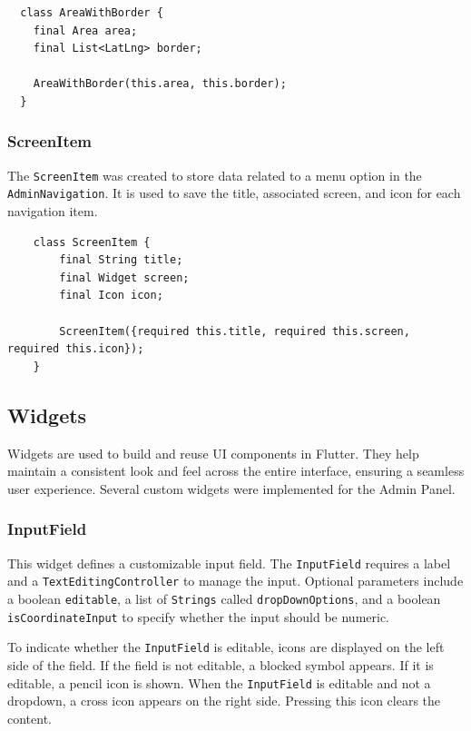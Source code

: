 \lstset{style=mycsharp, caption=AreaWithBorder class}
\begin{lstlisting}
  class AreaWithBorder {
    final Area area;
    final List<LatLng> border;
  
    AreaWithBorder(this.area, this.border);
  }
\end{lstlisting}

\subsubsection{ScreenItem}
\label{fig:ScreenItem}
The \texttt{ScreenItem} was created to store data related to a menu option in the \texttt{AdminNavigation}. It is used to save the title, associated screen, and icon for each navigation item.

\lstset{style=mycsharp, caption=ScreenItem class}
\begin{lstlisting}
    class ScreenItem {
        final String title;
        final Widget screen;
        final Icon icon;
        
        ScreenItem({required this.title, required this.screen, required this.icon});
    }
\end{lstlisting}


\subsection{Widgets}
Widgets are used to build and reuse UI components in Flutter. They help maintain a consistent look and feel across the entire interface, ensuring a seamless user experience. Several custom widgets were implemented for the Admin Panel.

\subsubsection{InputField}
\label{fig:InputField} 
This widget defines a customizable input field. The \texttt{InputField} requires a label and a \texttt{TextEditingController} to manage the input. Optional parameters include a boolean \texttt{editable}, a list of \texttt{Strings} called \texttt{dropDownOptions}, and a boolean \texttt{isCoordinateInput} to specify whether the input should be numeric.

To indicate whether the \texttt{InputField} is editable, icons are displayed on the left side of the field. If the field is not editable, a blocked symbol appears. If it is editable, a pencil icon is shown. When the \texttt{InputField} is editable and not a dropdown, a cross icon appears on the right side. Pressing this icon clears the content.

